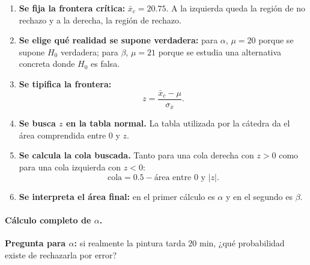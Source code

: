 \documentclass[11pt,a4paper]{article}
\begin{document}
\begin{enumerate}[label=\textbf{Paso \arabic* --},leftmargin=2.2cm,itemsep=3pt]
\item \textbf{Se fija la frontera crítica:} $\bar{x}_c=20.75$. A la izquierda queda la región de no rechazo y a la derecha, la región de rechazo.
\item \textbf{Se elige qué realidad se supone verdadera:} para $\alpha$, $\mu=20$ porque se supone $H_0$ verdadera; para $\beta$, $\mu=21$ porque se estudia una alternativa concreta donde $H_0$ es falsa.
\item \textbf{Se tipifica la frontera:}
\[
z=\frac{\bar{x}_c-\mu}{\sigma_{\bar{x}}}.
\]
\item \textbf{Se busca $z$ en la tabla normal.} La tabla utilizada por la cátedra da el área comprendida entre $0$ y $z$.
\item \textbf{Se calcula la cola buscada.} Tanto para una cola derecha con $z>0$ como para una cola izquierda con $z<0$:
\[
\text{cola}=0.5-\text{área entre }0\text{ y }|z|.
\]
\item \textbf{Se interpreta el área final:} en el primer cálculo es $\alpha$ y en el segundo es $\beta$.
\end{enumerate}

\begin{center}
\end{center}

\paragraph{Cálculo completo de $\alpha$.}

\textbf{Pregunta para $\alpha$:} si realmente la pintura tarda $20$ min, ¿qué probabilidad existe de rechazarla por error?
\end{document}
